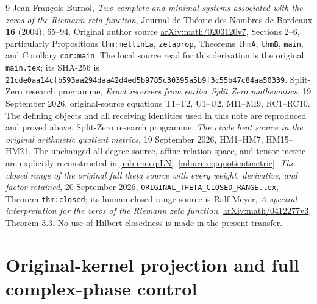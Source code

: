\documentclass[11pt]{article}
\begin{document}
\begin{thebibliography}{9}
 Jean-Fran\c{c}ois Burnol,
\emph{Two complete and minimal systems associated with the zeros
of the Riemann zeta function}, Journal de Th\'eorie des Nombres
de Bordeaux \textbf{16} (2004), 65--94.
Original author source \href{https://arxiv.org/abs/math/0203120v7}
{arXiv:math/0203120v7}, Sections 2--6, particularly
Propositions \texttt{thm:mellinLa}, \texttt{zetaprop},
Theorems \texttt{thmA}, \texttt{thmB}, \texttt{main}, and
Corollary \texttt{cor:main}. The local source read for this
derivation is the original \texttt{main.tex}; its SHA-256 is
\texttt{21cde0aa14cfb593aa294daa42d4ed5b9785c30395a5b9f3c55b47c84aa50339}.
 Split-Zero research programme,
\emph{Exact receivers from earlier Split Zero mathematics},
19 September 2026, original-source equations T1--T2, U1--U2,
MI1--MI9, RC1--RC10. The defining objects and all receiving
identities used in this note are reproduced and proved above.
 Split-Zero research programme,
\emph{The circle heat source in the original arithmetic quotient
metrics}, 19 September 2026, HM1--HM7, HM15--HM21.
The unchanged all-degree source, affine relation space, and
tensor metric are explicitly reconstructed in
\eqref{mburn:eq:LN}--\eqref{mburn:eq:quotientmetric}.
 \emph{The closed range of the original full
theta source with every weight, derivative, and factor retained},
20 September 2026, \texttt{ORIGINAL\_THETA\_CLOSED\_RANGE.tex},
Theorem \texttt{thm:closed}; its human closed-range source is
Ralf Meyer, \emph{A spectral interpretation for the zeros of the
Riemann zeta function}, \href{https://arxiv.org/abs/math/0412277v3}
{arXiv:math/0412277v3}, Theorem 3.3. No use of Hilbert closedness
is made in the present transfer.
\end{thebibliography}

\endgroup

\clearpage\begingroup
\part*{Original-kernel projection and full complex-phase control}
\newcommand{\mprojC}{\mathbb C}
\newcommand{\mprojim}{\operatorname{im}}
\newcommand{\mprojdiag}{\operatorname{diag}}
\newcommand{\mprojrank}{\operatorname{rank}}
\end{document}
